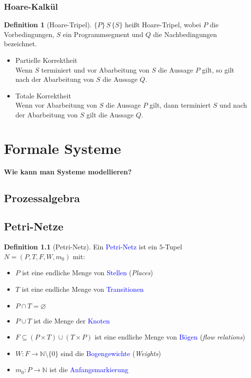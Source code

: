 \documentclass{scrreprt}
\theoremstyle{definition}
\newtheorem{Definition}{Definition}[section]
\theoremstyle{example}
\theoremstyle{algorithm}
\begin{document}
\subsection{Hoare-Kalkül}

\begin{Definition}[Hoare-Tripel]
$\{P\}\,S\,\{S\}$ heißt Hoare-Tripel, wobei $P$ die Vorbedingungen, $S$ ein Programmsegment und $Q$ die Nachbedingungen bezeichnet.
\begin{itemize}
\item Partielle Korrektheit\\
Wenn $S$ terminiert und vor Abarbeitung von $S$ die Aussage $P$ gilt, so gilt nach der Abarbeitung von $S$ die Aussage $Q$.
\item Totale Korrektheit\\
Wenn vor Abarbeitung von $S$ die Aussage $P$ gilt, dann terminiert $S$ und nach der Abarbeitung von $S$ gilt die Aussage $Q$.
\end{itemize}
\end{Definition}
\chapter{Formale Systeme}
{\Large\textbf{\textsf{Wie kann man Systeme modellieren?}}}
\section{Prozessalgebra}
\section{Petri-Netze}
\begin{Definition}[Petri-Netz]
Ein \textcolor{blue}{Petri-Netz} ist ein $5$-Tupel $N=(P,T,F,W,m_0)$ mit:
\begin{itemize}
\item
$P$ ist eine endliche Menge von \textcolor{blue}{Stellen} (\textit{Places})
\item
$T$ ist eine endliche Menge von \textcolor{blue}{Transitionen}
\item
$P\cap T = \varnothing$
\item
$P\cup T$ ist die Menge der \textcolor{blue}{Knoten}
\item
$F \subseteq (P\times T) \cup (T \times P)$ ist eine endliche Menge von \textcolor{blue}{Bögen} (\textit{flow relations})
\item
$W: F \rightarrow \mathbb{N} \setminus \{0\}$ sind die \textcolor{blue}{Bogengewichte} (\textit{Weights}) 
\item
$m_0: P \rightarrow \mathbb{N}$ ist die \textcolor{blue}{Anfangsmarkierung}
\end{itemize}
\end{Definition}
\end{document}
